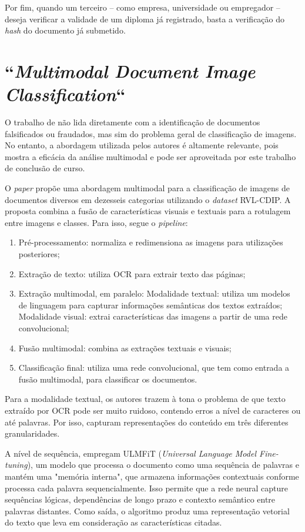 Por fim, quando um terceiro -- como empresa, universidade ou empregador -- deseja verificar a validade de um diploma já registrado, basta a verificação do \textit{hash} do documento já submetido.

\section{``\protect\textit{Multimodal Document Image Classification}``}

O trabalho de \citeauthor*{multimodal} \cite*{multimodal} não lida diretamente com a identificação de documentos falsificados ou fraudados, mas sim do problema geral de classificação de imagens. No entanto, a abordagem utilizada pelos autores é altamente relevante, pois mostra a eficácia da análise multimodal e pode ser aproveitada por este trabalho de conclusão de curso.

O \textit{paper} propõe uma abordagem multimodal para a classificação de imagens de documentos diversos em dezesseis categorias utilizando o \textit{dataset} RVL-CDIP. A proposta combina a fusão de características visuais e textuais para a rotulagem entre imagens e classes. Para isso, segue o \textit{pipeline}:

\begin{enumerate}
    \item Pré-processamento: normaliza e redimensiona as imagens para utilizações posteriores;
    \item Extração de texto: utiliza OCR para extrair texto das páginas;
    \item Extração multimodal, em paralelo:
    \subitem Modalidade textual: utiliza um modelos de linguagem para capturar informações semânticas dos textos extraídos;
    \subitem Modalidade visual: extrai características das imagens a partir de uma rede convolucional;
    \item Fusão multimodal: combina as extrações textuais e visuais;
    \item Classificação final: utiliza uma rede convolucional, que tem como entrada a fusão multimodal, para classificar os documentos.
\end{enumerate}

Para a modalidade textual, os autores trazem à tona o problema de que texto extraído por OCR pode ser muito ruidoso, contendo erros a nível de caracteres ou até palavras. Por isso, capturam representações do conteúdo em três diferentes granularidades. 

A nível de sequência, empregam ULMFiT (\textit{Universal Language Model Fine-tuning}), um modelo que processa o documento como uma sequência de palavras e mantém uma "memória interna", que armazena informações contextuais conforme processa cada palavra sequencialmente. Isso permite que a rede neural capture sequências lógicas, dependências de longo prazo e contexto semântico entre palavras distantes. Como saída, o algoritmo produz uma representação vetorial do texto que leva em consideração as características citadas.

